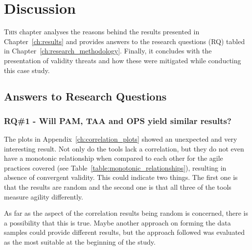 %


\chapter{Discussion}
\label{ch:discussion}
\lettrine[lines=4, loversize=-0.1, lraise=0.1]{T}{his} chapter analyses the reasons behind the results presented in Chapter~\ref{ch:results} and provides answers to the research questions (RQ) tabled in Chapter~\ref{ch:research_methodology}. Finally, it concludes with the presentation of validity threats and how these were mitigated while conducting this case study.

\section{Answers to Research Questions}

\subsection{RQ\#1 - Will \ac{PAM}, \ac{TAA} and \ac{OPS} yield similar results?}

The plots in Appendix~\ref{ch:correlation_plots} showed an unexpected and very interesting result. Not only do the tools lack a correlation, but they do not even have a monotonic relationship when compared to each other for the agile practices covered (see Table~\ref{table:monotonic_relationships}), resulting in absence of convergent validity. This could indicate two things. The first one is that the results are random and the second one is that all three of the tools measure agility differently. 

As far as the aspect of the correlation results being random is concerned, there is a possibility that this is true. Maybe another approach on forming the data samples could provide different results, but the approach followed was evaluated as the most suitable at the beginning of the study.

